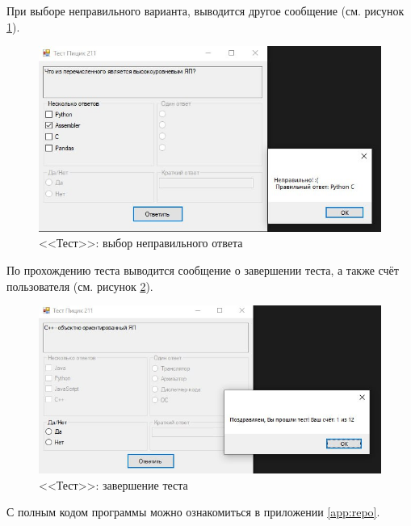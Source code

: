 При выборе неправильного варианта, выводится другое сообщение (см. рисунок \ref{fig:test_incorrect}).
\begin{figure}[H]
    \centering
    \includegraphics[scale=.85]{../img/test/test_incorrect.jpg}
    \caption{<<Тест>>: выбор неправильного ответа}
    \label{fig:test_incorrect}
\end{figure}

По прохождению теста выводится сообщение о завершении теста, а также счёт пользователя (см. рисунок \ref{fig:test_finish}).
\begin{figure}[H]
    \centering
    \includegraphics[scale=.85]{../img/test/test_finish.jpg}
    \caption{<<Тест>>: завершение теста}
    \label{fig:test_finish}
\end{figure}

С полным кодом программы можно ознакомиться в приложении \ref{app:repo}.